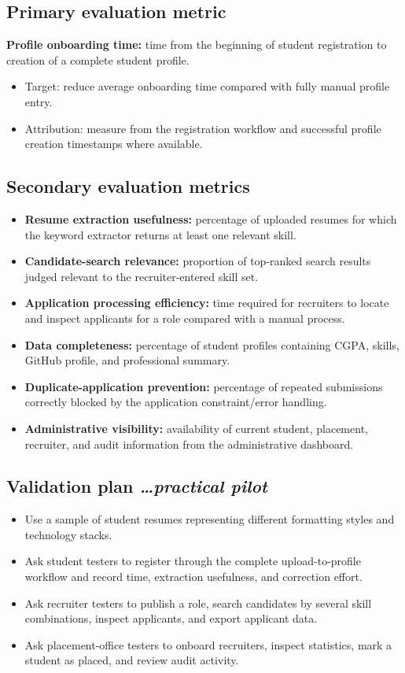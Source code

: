\documentclass[11pt,a4paper]{article}
\newcommand{\BvrHint}[1]{%
  {\normalfont\normalsize\itshape\hfill #1}}
\begin{document}
\subsection{Primary evaluation metric}
\textbf{Profile onboarding time:} time from the beginning of student registration to creation of a complete student profile.
\begin{itemize}[leftmargin=0.7cm]
    \item Target: reduce average onboarding time compared with fully manual profile entry.
    \item Attribution: measure from the registration workflow and successful profile creation timestamps where available.
\end{itemize}

\subsection{Secondary evaluation metrics}
\begin{itemize}[leftmargin=0.7cm]
    \item \textbf{Resume extraction usefulness:} percentage of uploaded resumes for which the keyword extractor returns at least one relevant skill.
    \item \textbf{Candidate-search relevance:} proportion of top-ranked search results judged relevant to the recruiter-entered skill set.
    \item \textbf{Application processing efficiency:} time required for recruiters to locate and inspect applicants for a role compared with a manual process.
    \item \textbf{Data completeness:} percentage of student profiles containing CGPA, skills, GitHub profile, and professional summary.
    \item \textbf{Duplicate-application prevention:} percentage of repeated submissions correctly blocked by the application constraint/error handling.
    \item \textbf{Administrative visibility:} availability of current student, placement, recruiter, and audit information from the administrative dashboard.
\end{itemize}

\subsection{Validation plan\BvrHint{\ldots practical pilot}}
\begin{itemize}[leftmargin=0.7cm]
    \item Use a sample of student resumes representing different formatting styles and technology stacks.
    \item Ask student testers to register through the complete upload-to-profile workflow and record time, extraction usefulness, and correction effort.
    \item Ask recruiter testers to publish a role, search candidates by several skill combinations, inspect applicants, and export applicant data.
    \item Ask placement-office testers to onboard recruiters, inspect statistics, mark a student as placed, and review audit activity.
\end{itemize}
\end{document}
